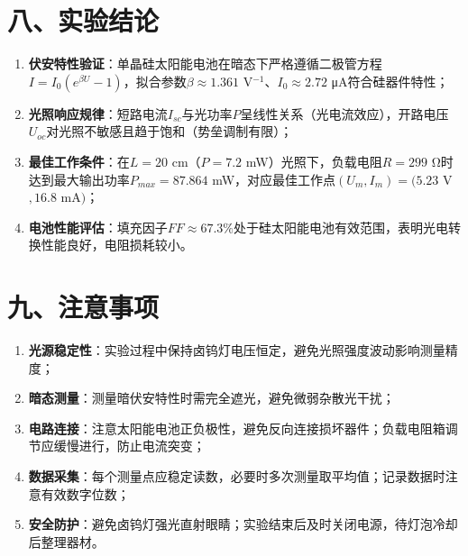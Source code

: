 \documentclass[12pt]{article}
\begin{document}
\section{八、实验结论}
\begin{enumerate}
  \item \textbf{伏安特性验证}：单晶硅太阳能电池在暗态下严格遵循二极管方程$I = I_0(e^{\beta U} - 1)$，拟合参数$\beta \approx 1.361$ V$^{-1}$、$I_0 \approx 2.72$ μA符合硅器件特性；
  \item \textbf{光照响应规律}：短路电流$I_{sc}$与光功率$P$呈线性关系（光电流效应），开路电压$U_{oc}$对光照不敏感且趋于饱和（势垒调制有限）；
  \item \textbf{最佳工作条件}：在$L=20$ cm（$P=7.2$ mW）光照下，负载电阻$R=299$ Ω时达到最大输出功率$P_{max}=87.864$ mW，对应最佳工作点$(U_m, I_m) = (5.23$ V$, 16.8$ mA$)$；
  \item \textbf{电池性能评估}：填充因子$FF \approx 67.3\%$处于硅太阳能电池有效范围，表明光电转换性能良好，电阻损耗较小。
\end{enumerate}

\section{九、注意事项}
\begin{enumerate}
  \item \textbf{光源稳定性}：实验过程中保持卤钨灯电压恒定，避免光照强度波动影响测量精度；
  \item \textbf{暗态测量}：测量暗伏安特性时需完全遮光，避免微弱杂散光干扰；
  \item \textbf{电路连接}：注意太阳能电池正负极性，避免反向连接损坏器件；负载电阻箱调节应缓慢进行，防止电流突变；
  \item \textbf{数据采集}：每个测量点应稳定读数，必要时多次测量取平均值；记录数据时注意有效数字位数；
  \item \textbf{安全防护}：避免卤钨灯强光直射眼睛；实验结束后及时关闭电源，待灯泡冷却后整理器材。
\end{enumerate}
\end{document}
